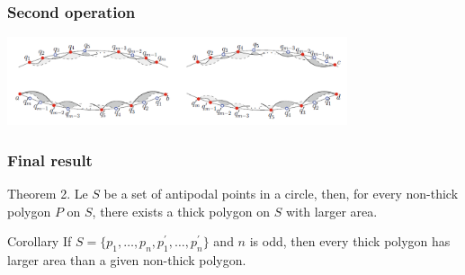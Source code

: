\documentclass{beamer}
\begin{document}
\begin{frame}
\frametitle{Second operation}
\includegraphics[width=10cm]{polant.png}

\end{frame}

\begin{frame}
\frametitle{Final result}
\begin{alertblock}{Theorem 2.}
Le $S$ be a set of antipodal points in a circle, then, for every non-thick polygon $P$ on $S$, there exists a thick polygon on $S$ with larger area.
\end{alertblock}\pause
\begin{alertblock}{Corollary}
If $S = \{p_{1},\dots,p_{n},p_{1}^{\prime},\dots,p_{n}^{\prime}\}$ and $n$ is odd, then every thick polygon has larger area than a given non-thick polygon.
\end{alertblock}

\end{frame}
\end{document}
